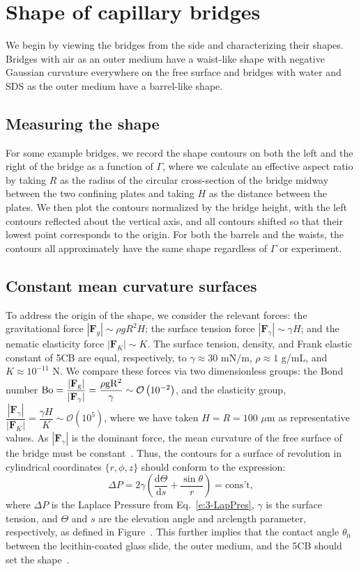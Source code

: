 \section{Shape of capillary bridges}
We begin by viewing the bridges from the side and characterizing their shapes.
Bridges with air as an outer medium have a waist-like shape with negative Gaussian curvature everywhere on the free surface and bridges with water and SDS as the outer medium have a barrel-like shape.


\subsection{Measuring the shape}
For some example bridges, we record the shape contours on both the left and the right of the bridge as a function of $\Gamma$, where we calculate an effective aspect ratio by taking $R$ as the radius of the circular cross-section of the bridge midway between the two confining plates and taking $H$ as the distance between the plates.
We then plot the contours normalized by the bridge height, with the left contours reflected about the vertical axis, and all contours shifted so that their lowest point corresponds to the origin.
For both the barrels and the waists, the contours all approximately have the same shape regardless of $\Gamma$ or experiment.


\subsection{Constant mean curvature surfaces}
To address the origin of the shape, we consider the relevant forces: the gravitational force $|\mathbf{F}_g| \sim \rho g R^2 H$; the surface tension force $|\mathbf{F}_{\gamma}| \sim \gamma H$; and the nematic elasticity force $|\mathbf{F}_K| \sim K$.
The surface tension, density, and Frank elastic constant of 5CB are equal, respectively, to $\gamma \approx 30$ mN/m, $\rho \approx 1$ g/mL, and $K \approx 10^{-11}$ N.
We compare these forces via two dimensionless groups: the Bond number $\rm{Bo} = \dfrac{|\mathbf{F}_g|}{|\mathbf{F}_{\gamma}|} = \dfrac{\rho g R^2}{\gamma} \sim  \mathcal{O}\left (10^{-2} \right)$, and the elasticity group,
 $\dfrac{|\mathbf{F}_{\gamma}|}{|\mathbf{F}_K|} =  \dfrac{\gamma H}{K} \sim \mathcal{O}\left (10^{5} \right )$, where we have taken $H = R = 100$ $\mu$m as representative values.
As $|\mathbf{F}_{\gamma}|$ is the dominant force, the mean curvature of the free surface of the bridge must be constant~\cite{RN178}.
Thus, the contours for a surface of revolution in cylindrical coordinates $\{r,\phi, z\}$ should conform to the expression:
\begin{equation}
  \Delta P = 2 \gamma \left ( \frac{\textrm{d}\Theta}{\textrm{d}s} + \frac{\sin \theta}{r} \right ) = \textrm{cons't},\label{e:5-ConsMeanCurv}
\end{equation}
where $\Delta P$ is the Laplace Pressure from Eq.~\ref{e:3-LapPres}, $\gamma$ is the surface tension, and $\Theta$ and $s$ are the elevation angle and arclength parameter, respectively, as defined in Figure~.
This further implies that the contact angle $\theta_0$ between the lecithin-coated glass slide, the outer medium, and the 5CB should set the shape~\cite{RN178}.


